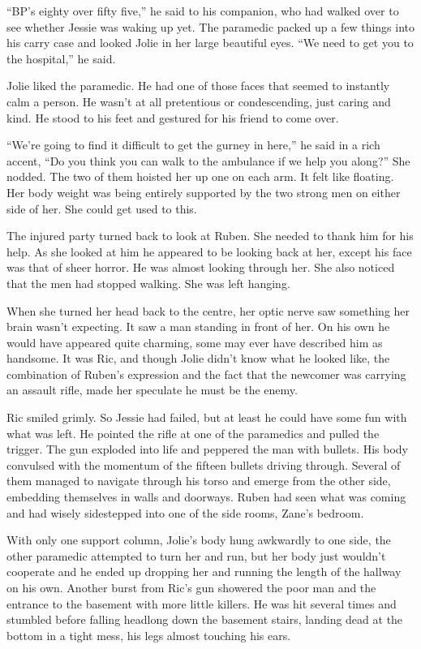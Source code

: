 ``BP's eighty over fifty five,'' he said to his companion, who had walked over to see whether Jessie was waking up yet.  The paramedic packed up a few things into his carry case and looked Jolie in her large beautiful eyes.  ``We need to get you to the hospital,'' he said.

Jolie liked the paramedic.  He had one of those faces that seemed to instantly calm a person.  He wasn't at all pretentious or condescending, just caring and kind.  He stood to his feet and gestured for his friend to come over.

``We're going to find it difficult to get the gurney in here,'' he said in a rich accent, ``Do you think you can walk to the ambulance if we help you along?''  She nodded.  The two of them hoisted her up one on each arm.  It felt like floating.  Her body weight was being entirely supported by the two strong men on either side of her.  She could get used to this.

The injured party turned back to look at Ruben.  She needed to thank him for his help.  As she looked at him he appeared to be looking back at her, except his face was that of sheer horror.  He was almost looking through her.  She also noticed that the men had stopped walking.  She was left hanging.

When she turned her head back to the centre, her optic nerve saw something her brain wasn't expecting.  It saw a man standing in front of her.  On his own he would have appeared quite charming, some may ever have described him as handsome.  It was Ric, and though Jolie didn't know what he looked like, the combination of Ruben's expression and the fact that the newcomer was carrying an assault rifle, made her speculate he must be the enemy.

Ric smiled grimly.  So Jessie had failed, but at least he could have some fun with what was left.  He pointed the rifle at one of the paramedics and pulled the trigger.  The gun exploded into life and peppered the man with bullets.  His body convulsed with the momentum of the fifteen bullets driving through.  Several of them managed to navigate through his torso and emerge from the other side, embedding themselves in walls and doorways.  Ruben had seen what was coming and had wisely sidestepped into one of the side rooms, Zane's bedroom.

With only one support column, Jolie's body hung awkwardly to one side, the other paramedic attempted to turn her and run, but her body just wouldn't cooperate and he ended up dropping her and running the length of the hallway on his own.  Another burst from Ric's gun showered the poor man and the entrance to the basement with more little killers.  He was hit several times and stumbled before falling headlong down the basement stairs, landing dead at the bottom in a tight mess, his legs almost touching his ears.

